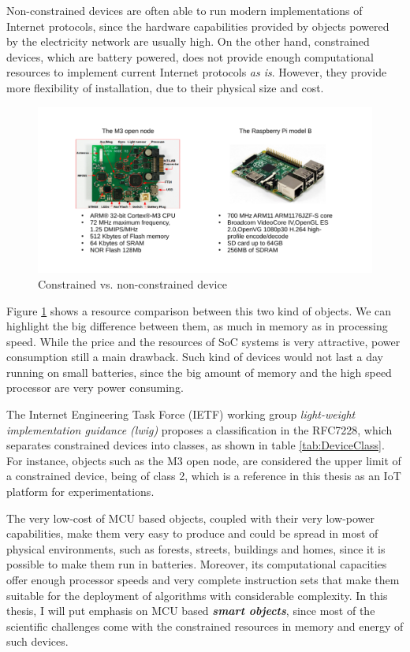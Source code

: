 Non-constrained devices are often able to run modern implementations of Internet protocols, since the hardware capabilities provided by objects powered by the electricity network are usually high.
On the other hand, constrained devices, which are battery powered, does not provide enough computational resources to implement current Internet protocols \textit{as is}.
However, they provide more flexibility of installation, due to their physical size and cost.

\begin{figure}[htb]
	\centering
	\includegraphics[width=1\columnwidth]{chapters/background.images/BoardsComparison.pdf}
	\caption{Constrained vs. non-constrained device}
	\label{fig:BoardsComparison}
\end{figure}

Figure \ref{fig:BoardsComparison} shows a resource comparison between this two kind of objects.
We can highlight the big difference between them, as much in memory as in processing speed.
While the price and the resources of SoC systems is very attractive, power consumption still a main drawback.
Such kind of devices would not last a day running on small batteries, since the big amount of memory and the high speed processor are very power consuming.

The Internet Engineering Task Force (IETF) working group \textit{light-weight implementation guidance (lwig)} proposes a classification in the RFC7228\cite{rfc7228}, which separates constrained devices into classes, as shown in table \ref{tab:DeviceClass}.
For instance, objects such as the M3 open node\cite{iotlab-m3}, are considered the upper limit of a constrained device, being of class 2, which is a reference in this thesis as an IoT platform for experimentations.

The very low-cost of MCU based objects, coupled with their very low-power capabilities, make them very easy to produce and could be spread in most of physical environments, such as forests, streets, buildings and homes, since it is possible to make them run in batteries.
Moreover, its computational capacities offer enough processor speeds and very complete instruction sets that make them suitable for the deployment of algorithms with considerable complexity.
In this thesis, I will put emphasis on MCU based \textit{\textbf{smart objects}}\cite{kortuem2010smart}, since most of the scientific challenges come with the constrained resources in memory and energy of such devices.

